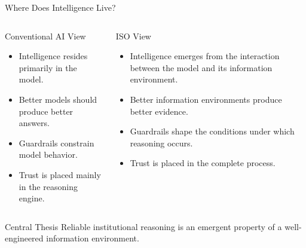 \documentclass[aspectratio=169]{beamer}
\begin{document}
\begin{frame}{Where Does Intelligence Live?}

\small

\begin{columns}[T]


\begin{block}{Conventional AI View}

\begin{itemize}
\item Intelligence resides primarily in the model.
\item Better models should produce better answers.
\item Guardrails constrain model behavior.
\item Trust is placed mainly in the reasoning engine.
\end{itemize}

\end{block}


\begin{block}{ISO View}

\begin{itemize}
\item Intelligence emerges from the interaction between the model and its information environment.
\item Better information environments produce better evidence.
\item Guardrails shape the conditions under which reasoning occurs.
\item Trust is placed in the complete process.
\end{itemize}

\end{block}

\end{columns}

\vspace{0.45cm}

\begin{alertblock}{Central Thesis}
Reliable institutional reasoning is an emergent property of a
well-engineered information environment.
\end{alertblock}

\end{frame}

\end{document}
